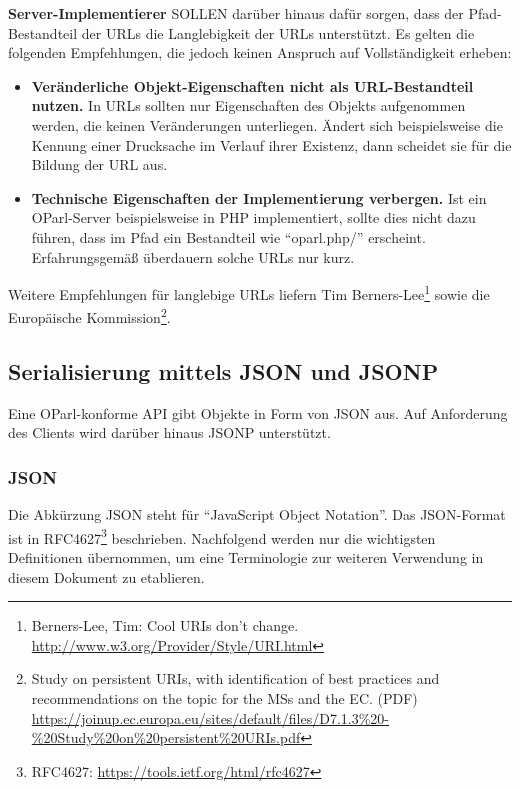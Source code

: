 \documentclass[,a4paper]{article}
\begin{document}
\textbf{Server-Implementierer} SOLLEN darüber hinaus dafür sorgen, dass
der Pfad-Bestandteil der URLs die Langlebigkeit der URLs unterstützt. Es
gelten die folgenden Empfehlungen, die jedoch keinen Anspruch auf
Vollständigkeit erheben:

\begin{itemize}
\item
  \textbf{Veränderliche Objekt-Eigenschaften nicht als URL-Bestandteil
  nutzen.} In URLs sollten nur Eigenschaften des Objekts aufgenommen
  werden, die keinen Veränderungen unterliegen. Ändert sich
  beispielsweise die Kennung einer Drucksache im Verlauf ihrer Existenz,
  dann scheidet sie für die Bildung der URL aus.
\item
  \textbf{Technische Eigenschaften der Implementierung verbergen.} Ist
  ein OParl-Server beispielsweise in PHP implementiert, sollte dies
  nicht dazu führen, dass im Pfad ein Bestandteil wie ``oparl.php/''
  erscheint. Erfahrungsgemäß überdauern solche URLs nur kurz.
\end{itemize}

Weitere Empfehlungen für langlebige URLs liefern Tim
Berners-Lee\footnote{Berners-Lee, Tim: Cool URIs don't change.
  \url{http://www.w3.org/Provider/Style/URI.html}} sowie die Europäische
Kommission\footnote{Study on persistent URIs, with identification of
  best practices and recommendations on the topic for the MSs and the
  EC. (PDF)
  \url{https://joinup.ec.europa.eu/sites/default/files/D7.1.3\%20-\%20Study\%20on\%20persistent\%20URIs.pdf}}.

\subsection{Serialisierung mittels JSON und
JSONP}\label{serialisierung-mittels-json-und-jsonp}

Eine OParl-konforme API gibt Objekte in Form von JSON aus. Auf
Anforderung des Clients wird darüber hinaus JSONP unterstützt.

\subsubsection{JSON}\label{json}

Die Abkürzung JSON steht für ``JavaScript Object Notation''. Das
JSON-Format ist in RFC4627\footnote{RFC4627:
  \url{https://tools.ietf.org/html/rfc4627}} beschrieben. Nachfolgend
werden nur die wichtigsten Definitionen übernommen, um eine Terminologie
zur weiteren Verwendung in diesem Dokument zu etablieren.
\end{document}
